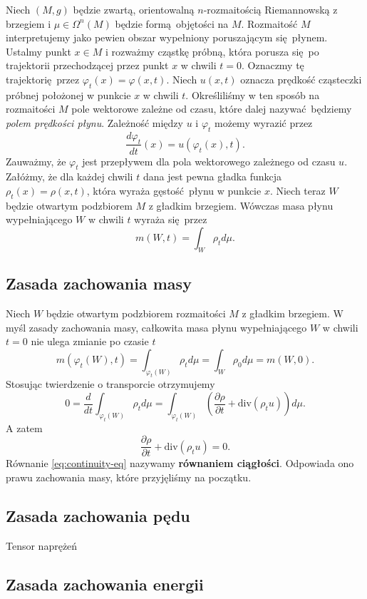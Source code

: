 Niech \((M, g)\) będzie zwartą, orientowalną \(n\)-rozmaitością Riemannowską z brzegiem i \(\mu \in \Omega^n(M)\) będzie formą objętości na \(M\). Rozmaitość \(M\) interpretujemy jako pewien obszar wypełniony poruszającym się płynem. Ustalmy punkt \(x\in M\) i rozważmy cząstkę próbną, która porusza się po trajektorii przechodzącej przez punkt \(x\) w chwili \(t=0\). Oznaczmy tę trajektorię przez \(\varphi_t(x)=\varphi(x,t)\). Niech \(u(x, t)\) oznacza prędkość cząsteczki próbnej położonej w punkcie \(x\) w chwili \(t\). Określiliśmy w ten sposób na rozmaitości \(M\) pole wektorowe zależne od czasu, które dalej nazywać będziemy \emph{polem prędkości płynu}. Zależność między \(u\) i \(\varphi_t\) możemy wyrazić przez
\begin{equation}\label{eq:first-step}
    \frac{d\varphi_t}{dt}(x) = u(\varphi_t(x), t). 
\end{equation}
Zauważmy, że \(\varphi_t\) jest przepływem dla pola wektorowego zależnego od czasu \(u\). Załóżmy, że dla każdej chwili \(t\) dana jest pewna gładka funkcja \(\rho_t(x)=\rho(x,t)\), która wyraża gęstość płynu w punkcie \(x\). Niech teraz \(W\) będzie otwartym podzbiorem \(M\) z gładkim brzegiem. Wówczas masa płynu wypełniającego \(W\) w chwili \(t\) wyraża się przez
\begin{equation}\label{eq:mass}
    m(W,t) = \int_W \rho_t d\mu.
\end{equation}

\subsection{Zasada zachowania masy} Niech \(W\) będzie otwartym podzbiorem rozmaitości \(M\) z gładkim brzegiem. W myśl zasady zachowania masy, całkowita masa płynu wypełniającego \(W\) w chwili \(t=0\) nie ulega zmianie po czasie \(t\)
\begin{equation}\label{eq:mass-cons-1}
    m\left(\varphi_t(W), t\right) = \int_{\varphi_t(W)}\rho_t d\mu = \int_W \rho_0 d\mu = m(W, 0).
\end{equation}
Stosując twierdzenie o transporcie otrzymujemy
\begin{equation*}
    0 = \frac{d}{dt}\int_{\varphi_t(W)} \rho_t d\mu = \int_{\varphi_t(W)}\left(\frac{\partial \rho}{\partial t} + \mathrm{div}(\rho_t u) \right) d\mu.
\end{equation*}
A zatem
\begin{equation}\label{eq:continuity-eq}
\frac{\partial \rho}{\partial t} + \mathrm{div}(\rho_t u) = 0. 
\end{equation}
Równanie \eqref{eq:continuity-eq} nazywamy \textbf{równaniem ciągłości}. Odpowiada ono prawu zachowania masy, które przyjęliśmy na początku.
\subsection{Zasada zachowania pędu}
Tensor naprężeń
\subsection{Zasada zachowania energii}

